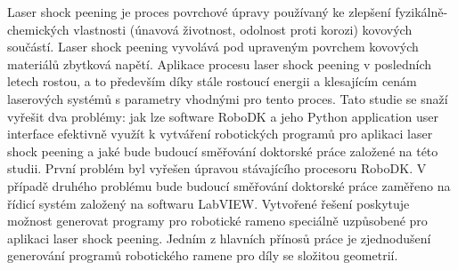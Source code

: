 ﻿%
Laser shock peening je proces povrchové úpravy používaný ke zlepšení fyzikálně-chemických vlastnosti (únavová životnost, odolnost proti korozi) kovových součástí. Laser shock peening vyvolává pod upraveným povrchem kovových materiálů zbytková napětí. Aplikace procesu laser shock peening v posledních letech rostou, a to především díky stále rostoucí energii a klesajícím cenám laserových systémů s parametry vhodnými pro tento proces. Tato studie se snaží vyřešit dva problémy: jak lze software RoboDK a jeho Python application user interface efektivně využít k vytváření robotických programů pro aplikaci laser shock peening a jaké bude budoucí směřování doktorské práce založené na této studii. První problém byl vyřešen úpravou stávajícího procesoru RoboDK. V případě druhého problému bude budoucí směřování doktorské práce zaměřeno na řídicí systém založený na softwaru LabVIEW. Vytvořené řešení poskytuje možnost generovat programy pro robotické rameno speciálně uzpůsobené pro aplikaci laser shock peening. Jedním z hlavních přínosů práce je zjednodušení generování programů robotického ramene pro díly se složitou geometrií.


